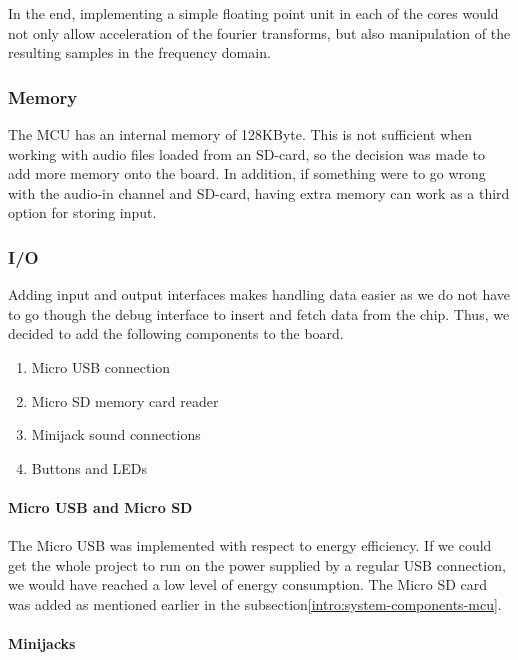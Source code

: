 In the end, implementing a simple floating point unit in each of the cores
would not only allow acceleration of the fourier transforms, but also
manipulation of the resulting samples in the frequency domain.

\subsubsection{Memory}

The MCU has an internal memory of 128KByte. This is not sufficient when working with audio files loaded from an SD-card, so the decision was made to add more memory 
onto the board. In addition, if something were to go wrong
with the audio-in channel and SD-card, having extra memory can work as a third
option for storing input.



\subsubsection{I/O}

Adding input and output interfaces makes handling data easier as we do not have
to go though the debug interface to insert and fetch data from the chip. Thus,
we decided to add the following components to the board.

\begin{enumerate}
	\item Micro USB connection
	\item Micro SD memory card reader
	\item Minijack sound connections
	\item Buttons and LEDs
\end{enumerate}

\paragraph{Micro USB and Micro SD}

The Micro USB was implemented with respect to energy efficiency. If we could get
the whole project to run on the power supplied by a regular USB connection, we
would have reached a low level of energy consumption. The Micro SD card was
added as mentioned earlier in the subsection\ref{intro:system-components-mcu}.

\paragraph{Minijacks}

